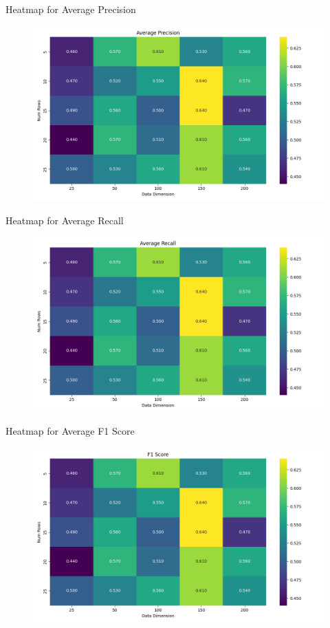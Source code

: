 \documentclass[Serif, 10pt, brown]{beamer}
\theoremstyle{example}
\theoremstyle{plain}
\begin{document}
\begin{frame}{Heatmap for Average Precision}
	\begin{figure}
		\centering
		\includegraphics[width=1\linewidth]{../images/precision_heatmap.png}
	\end{figure}
\end{frame}

\begin{frame}{Heatmap for Average Recall}
	\begin{figure}
		\centering
		\includegraphics[width=1\linewidth]{../images/recall_heatmap.png}
	\end{figure}
\end{frame}

\begin{frame}{Heatmap for Average F1 Score}
	\begin{figure}
		\centering
		\includegraphics[width=1\linewidth]{../images/f1_score_heatmap.png} 
	\end{figure}
\end{frame}
\end{document}
